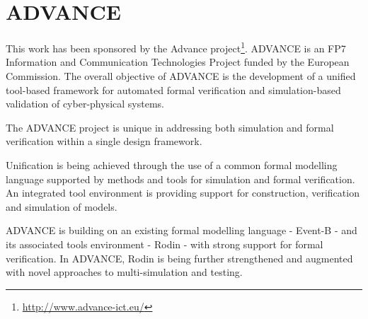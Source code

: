 \documentclass[12pt]{book}
\begin{document}
\section{ADVANCE}
\label{advance}

This work has been sponsored by the Advance project\footnote{\url{http://www.advance-ict.eu/}}.  ADVANCE is an FP7 Information and Communication Technologies Project funded by the European Commission. The overall objective of ADVANCE is the development of a unified tool-based framework for automated formal verification and simulation-based validation of cyber-physical systems.

The ADVANCE project is unique in addressing both simulation and formal verification within a single design framework.

Unification is being achieved through the use of a common formal modelling language supported by methods and tools for simulation and formal verification. An integrated tool environment is providing support for construction, verification and simulation of models.

ADVANCE is building on an existing formal modelling language - Event-B - and its associated tools environment - Rodin - with strong support for formal verification. In ADVANCE, Rodin is being further strengthened and augmented with novel approaches to multi-simulation and testing.



% 







\clearpage
{} 
\printindex
\end{document}
